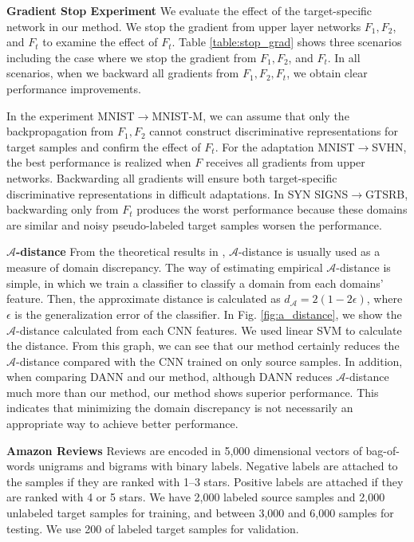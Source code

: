 \documentclass{article}
\begin{document}
\textbf{Gradient Stop Experiment}
We evaluate the effect of the target-specific network in our method. We stop the gradient from upper layer networks $F_1,F_2$, and $F_t$ to examine the effect of $F_t$. Table \ref{table:stop_grad} shows three scenarios including the case where we stop the gradient from $F_1,F_2$, and $F_t$. In all scenarios, when we backward all gradients from $F_1,F_2,F_t$, we obtain clear performance improvements.

In the experiment MNIST$\rightarrow$MNIST-M, we can assume that only the backpropagation from $F_1,F_2$ cannot construct discriminative representations for target samples and confirm the effect of $F_t$.
For the adaptation MNIST$\rightarrow$SVHN, the best performance is realized when $F$ receives all gradients from upper networks. Backwarding all gradients will ensure both target-specific discriminative representations in difficult adaptations.
In SYN SIGNS$\rightarrow$GTSRB, backwarding only from $F_t$ produces the worst performance because these domains are similar and noisy pseudo-labeled target samples worsen the performance.

\textbf{$\mathcal{A}$-distance}
From the theoretical results in \cite{ben2010theory}, $\mathcal{A}$-distance is usually used as a measure of domain discrepancy. The way of estimating empirical $\mathcal{A}$-distance is simple, in which we train a classifier to classify a domain from each domains' feature. Then, the approximate distance is calculated as $\hat d_{\mathcal{A}} = 2(1-2\epsilon)$, where $\epsilon$ is the generalization error of the classifier. 
In Fig. \ref{fig:a_distance}, we show the $\mathcal{A}$-distance calculated from each CNN features. We used linear SVM to calculate the distance. From this graph, we can see that our method certainly reduces the $\mathcal{A}$-distance compared with the CNN trained on only source samples. In addition, when comparing DANN and our method, although DANN reduces $\mathcal{A}$-distance much more than our method, our method shows superior performance. This indicates that minimizing the domain discrepancy is not necessarily an appropriate way to achieve better performance.


\textbf{Amazon Reviews}
Reviews are encoded in 5,000 dimensional vectors of bag-of-words unigrams and bigrams with binary labels. Negative labels are attached to the samples if they are ranked with 1--3 stars. Positive labels are attached if they are ranked with 4 or 5 stars. We have 2,000 labeled source samples and 2,000 unlabeled target samples for training, and between 3,000 and 6,000 samples for testing. We use 200 of labeled target samples for validation.
\end{document}
